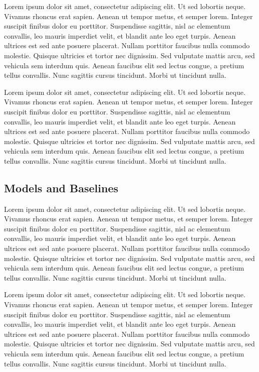 Lorem ipsum dolor sit amet, consectetur adipiscing elit. Ut sed lobortis neque. Vivamus rhoncus erat sapien. Aenean ut tempor metus, et semper lorem. Integer suscipit finibus dolor eu porttitor. Suspendisse sagittis, nisl ac elementum convallis, leo mauris imperdiet velit, et blandit ante leo eget turpis. Aenean ultrices est sed ante posuere placerat. Nullam porttitor faucibus nulla commodo molestie. Quisque ultricies et tortor nec dignissim. Sed vulputate mattis arcu, sed vehicula sem interdum quis. Aenean faucibus elit sed lectus congue, a pretium tellus convallis. Nunc sagittis cursus tincidunt. Morbi ut tincidunt nulla.

Lorem ipsum dolor sit amet, consectetur adipiscing elit. Ut sed lobortis neque. Vivamus rhoncus erat sapien. Aenean ut tempor metus, et semper lorem. Integer suscipit finibus dolor eu porttitor. Suspendisse sagittis, nisl ac elementum convallis, leo mauris imperdiet velit, et blandit ante leo eget turpis. Aenean ultrices est sed ante posuere placerat. Nullam porttitor faucibus nulla commodo molestie. Quisque ultricies et tortor nec dignissim. Sed vulputate mattis arcu, sed vehicula sem interdum quis. Aenean faucibus elit sed lectus congue, a pretium tellus convallis. Nunc sagittis cursus tincidunt. Morbi ut tincidunt nulla.

\subsection{Models and Baselines}
Lorem ipsum dolor sit amet, consectetur adipiscing elit. Ut sed lobortis neque. Vivamus rhoncus erat sapien. Aenean ut tempor metus, et semper lorem. Integer suscipit finibus dolor eu porttitor. Suspendisse sagittis, nisl ac elementum convallis, leo mauris imperdiet velit, et blandit ante leo eget turpis. Aenean ultrices est sed ante posuere placerat. Nullam porttitor faucibus nulla commodo molestie. Quisque ultricies et tortor nec dignissim. Sed vulputate mattis arcu, sed vehicula sem interdum quis. Aenean faucibus elit sed lectus congue, a pretium tellus convallis. Nunc sagittis cursus tincidunt. Morbi ut tincidunt nulla.

Lorem ipsum dolor sit amet, consectetur adipiscing elit. Ut sed lobortis neque. Vivamus rhoncus erat sapien. Aenean ut tempor metus, et semper lorem. Integer suscipit finibus dolor eu porttitor. Suspendisse sagittis, nisl ac elementum convallis, leo mauris imperdiet velit, et blandit ante leo eget turpis. Aenean ultrices est sed ante posuere placerat. Nullam porttitor faucibus nulla commodo molestie. Quisque ultricies et tortor nec dignissim. Sed vulputate mattis arcu, sed vehicula sem interdum quis. Aenean faucibus elit sed lectus congue, a pretium tellus convallis. Nunc sagittis cursus tincidunt. Morbi ut tincidunt nulla.

